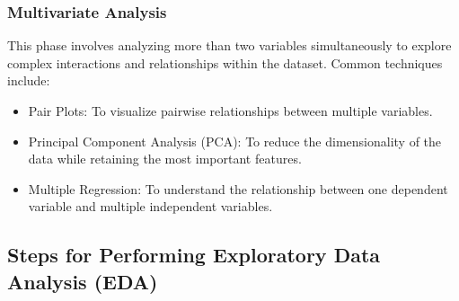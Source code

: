 \subsubsection*{Multivariate Analysis}  
This phase involves analyzing more than two variables simultaneously to explore complex interactions and relationships within the dataset. Common techniques include:
\begin{itemize}
    \item Pair Plots: To visualize pairwise relationships between multiple variables.
    \item Principal Component Analysis (PCA): To reduce the dimensionality of the data while retaining the most important features.
    \item Multiple Regression: To understand the relationship between one dependent variable and multiple independent variables.
\end{itemize}

\subsection*{Steps for Performing Exploratory Data Analysis (EDA)}

